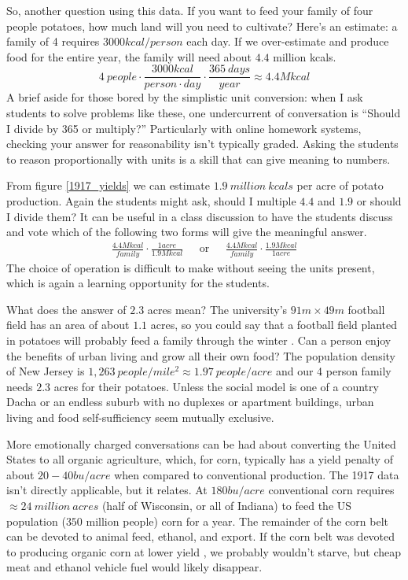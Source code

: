 \documentclass[prb,preprint]{revtex4-2}
\newcommand{\be}{\begin{equation}}
\newcommand{\ee}{\end{equation}}
\newcommand{\bea}{\begin{eqnarray}}
\newcommand{\eea}{\end{eqnarray}}
\begin{document}
So, another question using this data.  If you want to feed your family of four people potatoes, how much land will you need to cultivate?
Here's an estimate: a family of 4 requires $3000kcal/person$ each day\cite{calorie_age}.  If we over-estimate and produce food for the entire year, the family will need about $4.4$ million kcals.
\be
4~people\cdot\frac{3000kcal}{person\cdot day}\cdot\frac{365~days}{year} \approx 4.4 M kcal 
\ee
A brief aside for those bored by the simplistic unit conversion: when I ask students to solve problems like these, one undercurrent of conversation is ``Should I divide by 365 or multiply?''  Particularly with online homework systems, checking your answer for reasonability isn't  typically graded. Asking the students to reason proportionally with units is a skill that can give meaning to numbers. 

From figure \ref{1917_yields} we can estimate $1.9~million~kcals$ per acre of potato production.  Again the students might ask, should I multiple $4.4$ and $1.9$ or should I divide them?  It can be useful in a class discussion to have the students discuss and vote which of the following two forms will give the meaningful answer.
\bea
\frac{4.4 M kcal}{family}\cdot\frac{1 acre}{1.9M kcal}  & \textrm{~~or~~}&
\frac{4.4 M kcal}{family}\cdot\frac{1.9M kcal}{1 acre}
\eea
The choice of operation is difficult to make without seeing the units present, which is again a learning opportunity for the students.

What does the answer of $2.3$ acres mean?  The university's $91m\times49m$ football field has an area of about $1.1$ acres, so you could say that a football field planted in potatoes will probably feed a family through the winter \cite{Deppe}.  Can a person enjoy the benefits of urban living and grow all their own food?  The population density of New Jersey is $1,263~people/mile^2 \approx1.97~people/acre$ and our 4 person family needs $2.3$ acres for their potatoes.  
Unless the social model is one of a country Dacha or an endless suburb with no duplexes or apartment buildings, urban living and food self-sufficiency seem mutually exclusive.


More emotionally charged conversations can be had about converting the United States to all organic agriculture, which, for corn, typically has a yield penalty of about $20-40bu/acre$ when compared to conventional production.  The 1917 data isn't directly applicable, but it relates. At $180bu/acre$ conventional corn requires $\approx 24~million~acres$ (half of Wisconsin, or all of Indiana) to feed the US population ($350$ million people) corn for a year.  The remainder of the corn belt can be devoted to animal feed, ethanol, and export.  If the corn belt was devoted to producing organic corn at lower yield \cite{organic_corn_yield}, we probably wouldn't starve, but cheap meat and ethanol vehicle fuel would likely disappear.   
\end{document}
